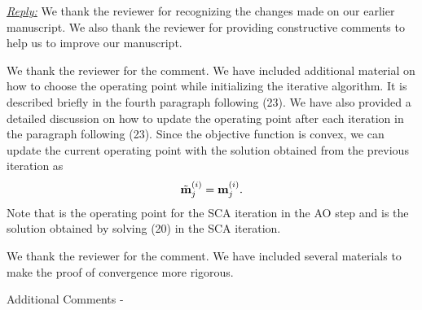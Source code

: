 
\vspace{1eM}
\underline{\textit{Reply:}} We thank the reviewer for recognizing the changes made on our earlier manuscript. We also thank the reviewer for providing constructive comments to help us to improve our manuscript.

\begin{enumerate}
 

\resp We thank the reviewer for the comment. We have included additional material on how to choose the operating point while initializing the iterative algorithm. It is described briefly in the fourth paragraph following (23). We have also provided a detailed discussion on how to update the operating point after each iteration in the paragraph following (23). Since the objective function is convex, we can update the current operating point with the solution obtained from the previous iteration as
\begin{equation}
\tilde{\mathbf{m}}_{j}^{(i)} = \mathbf{m}_{j}^{(i)}.
\end{equation}
Note that  is the operating point for the  \ac{SCA} iteration in the  \ac{AO} step and  is the solution obtained by solving (20) in the  \ac{SCA} iteration.

 

\resp We thank the reviewer for the comment. We have included several materials to make the proof of convergence more rigorous.

Additional Comments - 

\begin{enumerate}
	

\end{enumerate}
\end{enumerate}
